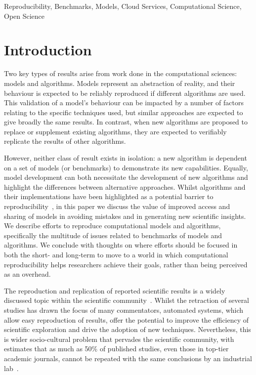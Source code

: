 \documentclass[conference]{IEEEtran}
\begin{document}
\begin{IEEEkeywords}
Reproducibility, Benchmarks, Models, Cloud Services,
Computational Science, Open Science
\end{IEEEkeywords}

\IEEEpeerreviewmaketitle

\section{Introduction}
Two key types of results arise from work done in the computational
sciences: models and algorithms. Models represent an abstraction of
reality, and their behaviour is expected to be reliably reproduced if
different algorithms are used. This validation of a model's behaviour
can be impacted by a number of factors relating to the specific
techniques used, but similar approaches are expected to give broadly
the same results.  In contrast, when new algorithms are proposed to
replace or supplement existing algorithms, they are expected to
verifiably replicate the results of other algorithms.

However, neither class of result exists in isolation: a new algorithm is
dependent on a set of models (or benchmarks) to demonstrate its new
capabilities. Equally, model development can both necessitate the
development of new algorithms and highlight the differences between
alternative approaches. Whilst algorithms and their implementations
have been highlighted as a potential barrier to
reproducibility~\cite{crick-et-al_wssspe2}, in this paper we discuss the value
of improved access and sharing of models in avoiding mistakes and in
generating new scientific insights. We describe efforts to reproduce
computational models and algorithms, specifically the multitude of issues
related to benchmarks of models and algorithms. 
We conclude with thoughts %
on where efforts should be focused in both the short- and
long-term to move to a world in which computational reproducibility
helps researchers achieve their goals, rather than being perceived as
an overhead.


The reproduction and replication of reported scientific results is a
widely discussed topic within the scientific
community~\cite{barnes:2010,morin-et-al:2012,joppa-et-al:2013}.
Whilst the retraction of several studies has drawn the focus of many
commentators, automated systems, which allow easy reproduction of
results, offer the potential to improve the efficiency of scientific
exploration and drive the adoption of new techniques. Nevertheless,
this is wider socio-cultural problem that pervades the scientific
community, with estimates that as much as 50\% of published studies,
even those in top-tier academic journals, cannot be repeated with the
same conclusions by an industrial lab~\cite{osherovich:2011}.
\end{document}
